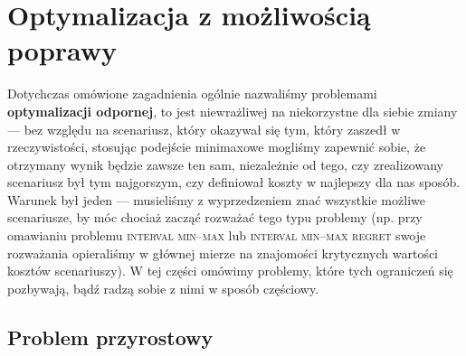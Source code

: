 \section{Optymalizacja z możliwością poprawy}

Dotychczas omówione zagadnienia ogólnie nazwaliśmy problemami \textbf{optymalizacji odpornej}, to jest niewrażliwej na niekorzystne dla siebie zmiany --- bez względu na scenariusz, który okazywał się tym, który zaszedł w rzeczywistości, stosując podejście minimaxowe mogliśmy zapewnić sobie, że otrzymany wynik będzie zawsze ten sam, niezależnie od tego, czy zrealizowany scenariusz był tym najgorszym, czy definiował koszty w najlepszy dla nas sposób. Warunek był jeden --- musieliśmy z wyprzedzeniem znać wszystkie możliwe scenariusze, by móc chociaż zacząć rozważać tego typu problemy (np. przy omawianiu problemu \textsc{interval min--max} lub \textsc{interval min--max regret} swoje rozważania opieraliśmy w głównej mierze na znajomości krytycznych wartości kosztów scenariuszy). W tej części omówimy problemy, które tych ograniczeń się pozbywają, bądź radzą sobie z nimi w sposób częściowy. 

\subsection{Problem przyrostowy}

